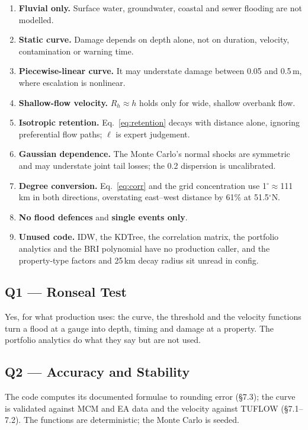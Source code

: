 \documentclass[11pt,a4paper]{article}
\begin{document}
\begin{enumerate}
    \item \textbf{Fluvial only.} Surface water, groundwater, coastal and sewer flooding
          are not modelled.
    \item \textbf{Static curve.} Damage depends on depth alone, not on duration,
          velocity, contamination or warning time.
    \item \textbf{Piecewise-linear curve.} It may understate damage between 0.05 and
          0.5\,m, where escalation is nonlinear.
    \item \textbf{Shallow-flow velocity.} $R_h\approx h$ holds only for wide, shallow
          overbank flow.
    \item \textbf{Isotropic retention.} Eq.~\eqref{eq:retention} decays with distance
          alone, ignoring preferential flow paths; $\ell$ is expert judgement.
    \item \textbf{Gaussian dependence.} The Monte Carlo's normal shocks are symmetric and
          may understate joint tail losses; the 0.2 dispersion is uncalibrated.
    \item \textbf{Degree conversion.} Eq.~\eqref{eq:corr} and the grid concentration use
          1$^\circ\approx$111\,km in both directions, overstating east--west distance by
          61\% at 51.5$^\circ$N.
    \item \textbf{No flood defences} and \textbf{single events only}.
    \item \textbf{Unused code.} IDW, the KDTree, the correlation matrix, the portfolio
          analytics and the BRI polynomial have no production caller, and the property-type
          factors and 25\,km decay radius sit unread in config.
\end{enumerate}

\mkmgovernance

\subsection{Q1 --- Ronseal Test}
Yes, for what production uses: the curve, the threshold and the velocity functions turn
a flood at a gauge into depth, timing and damage at a property. The portfolio analytics
do what they say but are not used.

\subsection{Q2 --- Accuracy and Stability}
The code computes its documented formulae to rounding error (\S7.3); the curve is
validated against MCM and EA data and the velocity against TUFLOW (\S7.1--7.2). The
functions are deterministic; the Monte Carlo is seeded.
\end{document}
